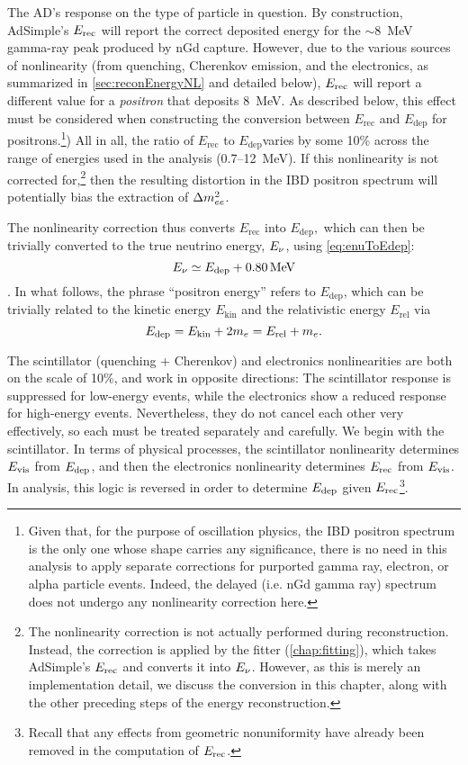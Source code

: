 \documentclass[../thesis.tex]{subfiles}
\begin{document}
The AD's response on the type of particle in question. By construction, AdSimple's $E_\mathrm{rec}$ will report the correct deposited energy for the $\sim$8~MeV gamma-ray peak produced by nGd capture. However, due to the various sources of nonlinearity (from quenching, Cherenkov emission, and the electronics, as summarized in \autoref{sec:reconEnergyNL} and detailed below), $E_\mathrm{rec}$ will report a different value for a \emph{positron} that deposits 8~MeV. As described below, this effect must be considered when constructing the conversion between $E_{\mathrm{rec}}$ and $E_{\mathrm{dep}}$ for positrons.\footnote{Given that, for the purpose of oscillation physics, the IBD positron spectrum is the only one whose shape carries any significance, there is no need in this analysis to apply separate corrections for purported gamma ray, electron, or alpha particle events. Indeed, the delayed (i.e. nGd gamma ray) spectrum does not undergo any nonlinearity correction here.}) All in all, the ratio of $E_{\mathrm{rec}}$ to $E_{\mathrm{dep}} $varies by some 10\% across the range of energies used in the analysis (0.7--12~MeV). If this nonlinearity is not corrected for,\footnote{The nonlinearity correction is not actually performed during reconstruction. Instead, the correction is applied by the fitter (\autoref{chap:fitting}), which takes AdSimple's $E_\mathrm{rec}$ and converts it into $E_\mathrm{\nu}$. However, as this is merely an implementation detail, we discuss the conversion in this chapter, along with the other preceding steps of the energy reconstruction.} then the resulting distortion in the IBD positron spectrum will potentially bias the extraction of $\Delta m^2_{ee}$.

The nonlinearity correction thus converts $E_{\mathrm{rec}}$ into $E_{\mathrm{dep}},$ which can then be trivially converted to the true neutrino energy, $E_\mathrm{\nu}$, using \autoref{eq:enuToEdep}:
\begin{equation}
  E_\mathrm{\nu} \simeq E_\mathrm{dep} + \SI{0.80}{MeV} 
\end{equation}.
In what follows, the phrase ``positron energy'' refers to $E_{\mathrm{dep}}$, which can be trivially related to the kinetic energy $E_{\mathrm{kin}}$ and the relativistic energy $E_{\mathrm{rel}}$ via
\begin{equation}
  E_\mathrm{dep} = E_{\mathrm{kin}} + 2m_e = E_{\mathrm{rel}} + m_e.
\end{equation}

The scintillator (quenching + Cherenkov)  and electronics nonlinearities are both on the scale of 10\%, and work in opposite directions: The scintillator response is suppressed for low-energy events, while the electronics show a reduced response for high-energy events. Nevertheless, they do not cancel each other very effectively, so each must be treated separately and carefully. We begin with the scintillator. In terms of physical processes, the scintillator nonlinearity determines $E_\mathrm{vis}$ from $E_\mathrm{dep}$, and then the electronics nonlinearity determines $E_\mathrm{rec}$ from $E_\mathrm{vis}$. In analysis, this logic is reversed in order to determine $E_\mathrm{dep}$ given $E_\mathrm{rec}$\footnote{Recall that any effects from geometric nonuniformity have already been removed in the computation of $E_\mathrm{rec}$.}.
\end{document}
